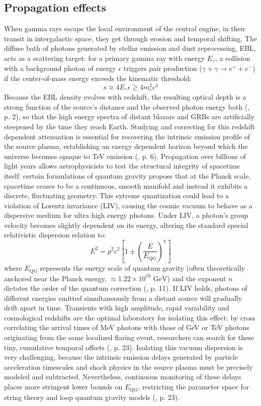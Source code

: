 \documentclass{aa} %
\begin{document}
\subsection{Propagation effects}
When gamma rays escape the local environment of the central engine, in their transit in intergalactic space, they get through erosion and temporal shifting. The diffuse bath of photons generated by stellar emission and dust reprocessing, EBL, acts as a scattering target: for a primary gamma ray with energy $E_\gamma$, a collision with a background photon of energy $\epsilon$ triggers pair production ($\gamma + \gamma \rightarrow e^+ + e^-$) if the center-of-mass energy exceeds the kinematic threshold:
$$s \approx 4 E_\gamma \epsilon \ge 4 m_e^2 c^4$$
Because the EBL density evolves with redshift, the resulting optical depth is a strong function of the source's distance and the observed photon energy both (\citet{Boettcheretal1996}, p. 2), so that the high energy spectra of distant blazars and GRBs are artificially steepened by the time they reach Earth. Studying and correcting for this redshift dependent attenuation is essential for recovering the intrinsic emission profile of the source plasma, establishing an energy dependent horizon beyond which the universe becomes opaque to TeV emission (\citet{KumarandZhang2015}, p. 6).
Propagation over billions of light years allows astrophysicists to test the structural integrity of spacetime itself: certain formulations of quantum gravity propose that at the Planck scale, spacetime ceases to be a continuous, smooth manifold and instead it exhibits a discrete, fluctuating geometry. This extreme quantization could lead to a violation of Lorentz invariance (LIV), causing the cosmic vacuum to behave as a dispersive medium for ultra high energy photons. Under LIV, a photon's group velocity becomes slightly dependent on its energy, altering the standard special relativistic dispersion relation to:
$$E^2 = p^2 c^2 \left[ 1 \pm \left( \frac{E}{E_{\text{QG}}} \right)^n \right]$$
where $E_{\text{QG}}$ represents the energy scale of quantum gravity (often theoretically anchored near the Planck energy, $\approx 1.22 \times 10^{19} \text{ GeV}$) and the exponent $n$ dictates the order of the quantum correction (\citet{Addazietal2021}, p. 11).
If LIV holds, photons of different energies emitted simultaneously from a distant source will gradually drift apart in time. Transients with high amplitude, rapid variability and cosmological redshifts are the optimal laboratory for isolating this effect: by cross correlating the arrival times of MeV photons with those of GeV or TeV photons originating from the same localized flaring event, researchers can search for these tiny, cumulative temporal offsets (\citet{Addazietal2021}, p. 23).
Isolating this vacuum dispersion is very challenging, because the intrinsic emission delays generated by particle acceleration timescales and shock physics in the source plasma must be precisely modeled and subtracted. Nevertheless, continuous monitoring of these delays places more stringent lower bounds on $E_{\text{QG}}$, restricting the parameter space for string theory and loop quantum gravity models (\citet{Addazietal2021}, p. 23). 
\end{document}
